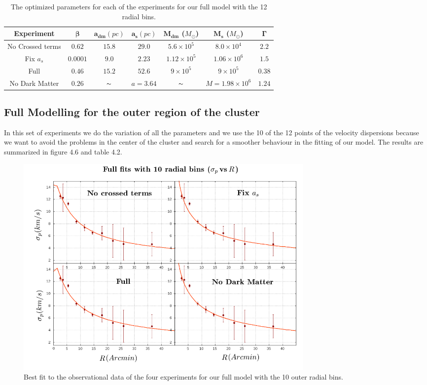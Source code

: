 \begin{table}[H]
\begin{center}
\begin{tabular}{| c | c | c | c | c | c | c| }
    \hline
    \textbf{Experiment} & $\mathbf{\beta}$ & $\mathbf{a_{dm}} (pc)$ & $\mathbf{a_{s}} (pc)$ & $\mathbf{M_{dm}}$ ($M_{\odot}$) & $\mathbf{M_{s}}$ ($M_{\odot}$) & $\mathbf{\Gamma}$\\ \hline
	No Crossed terms & $0.62$ &	$15.8$ &	$29.0$ &	$5.6 \times 10^{5}$ &	$8.0 \times 10^{4}$ &	$2.2$\\ \hline
	Fix $a_s$ &	$0.0001$ &	$9.0$ &	$2.23$ &	$1.12 \times 10^{5}$ &	$1.06 \times 10 ^{6}$ &	$1.5$\\ \hline
	Full &	$0.46$ &	$15.2$ &	$52.6$ &	$9 \times 10^{5}$ &	$9 \times 10^{5}$ &	$0.38$\\ \hline
	No Dark Matter &	$0.26$ & $\thicksim$	& $ a = 3.64$  & $\thicksim$ & $  M = 1.98 \times 10^{6}$ & 	$1.24$\\
    \hline
  \end{tabular} 
\caption[Optimized parameters for our full model with the 12 radial bins.]{The optimized parameters for each of the experiments for our full model with the 12 radial bins.}
\end{center}
\end{table}


\subsection{Full Modelling for the outer region of the cluster}

In this set of experiments we do the variation of all the parameters and we use the 10 of the 12 points of the velocity dispersions because we want to avoid the problems in the center of the cluster and search for a smoother behaviour in the fitting of our model. The results are summarized in figure 4.6 and table 4.2.

\begin{figure}[H]
\centering
\includegraphics[width=15cm]{images/all_params_refinado_10.png}
\caption[Best fit of the full model for 10 radial bins]{Best fit to the observational data of the four experiments for our full model with the 10 outer radial bins.}
\end{figure}

